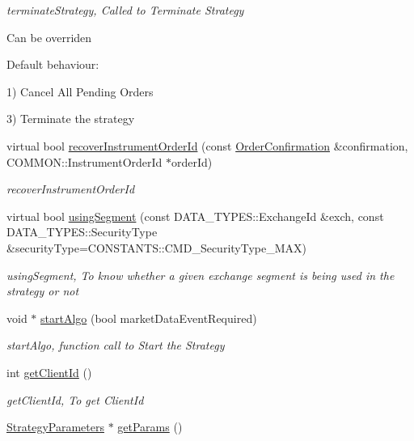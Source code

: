 \begin{DoxyCompactItemize}
\begin{DoxyCompactList}\small\item\em terminate\-Strategy, Called to Terminate Strategy\par
 Can be overriden \par
 Default behaviour\-: \par
 1) Cancel All Pending Orders \par
 3) Terminate the strategy \par
 \end{DoxyCompactList}\item 
virtual bool \hyperlink{class_a_p_i2_1_1_s_g_context_a8afc5581b6574466fe9fe502245b930d}{recover\-Instrument\-Order\-Id} (const \hyperlink{class_a_p_i2_1_1_order_confirmation}{Order\-Confirmation} \&confirmation, C\-O\-M\-M\-O\-N\-::\-Instrument\-Order\-Id $\ast$order\-Id)
\begin{DoxyCompactList}\small\item\em recover\-Instrument\-Order\-Id \end{DoxyCompactList}\item 
virtual bool \hyperlink{class_a_p_i2_1_1_s_g_context_a6abdff23ca1cd361f618c4bf84cfec0c}{using\-Segment} (const D\-A\-T\-A\-\_\-\-T\-Y\-P\-E\-S\-::\-Exchange\-Id \&exch, const D\-A\-T\-A\-\_\-\-T\-Y\-P\-E\-S\-::\-Security\-Type \&security\-Type=C\-O\-N\-S\-T\-A\-N\-T\-S\-::\-C\-M\-D\-\_\-\-Security\-Type\-\_\-\-M\-A\-X)
\begin{DoxyCompactList}\small\item\em using\-Segment, To know whether a given exchange segment is being used in the strategy or not \end{DoxyCompactList}\item 
void $\ast$ \hyperlink{class_a_p_i2_1_1_s_g_context_a44cb008b60a1e0a376c6d7909bd11de2}{start\-Algo} (bool market\-Data\-Event\-Required)
\begin{DoxyCompactList}\small\item\em start\-Algo, function call to Start the Strategy \end{DoxyCompactList}\item 
int \hyperlink{class_a_p_i2_1_1_s_g_context_aee86b97a48929d22d5c6afd9c5d68838}{get\-Client\-Id} ()
\begin{DoxyCompactList}\small\item\em get\-Client\-Id, To get Client\-Id \end{DoxyCompactList}\item 
\hyperlink{class_a_p_i2_1_1_strategy_parameters}{Strategy\-Parameters} $\ast$ \hyperlink{class_a_p_i2_1_1_s_g_context_a653537350a6cc355bf79564b33dbba92}{get\-Params} ()

\end{DoxyCompactItemize}
